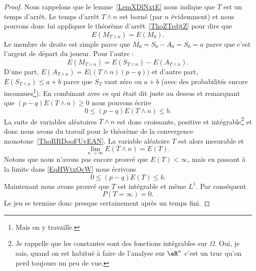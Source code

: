 \begin{proof}
	Nous rappelons que le lemme~\ref{LemXDlNxtE} nous indique que \( T\) est un temps d'arrêt. Le temps d'arrêt \( T\wedge n\) est borné (par \( n\) évidemment) et nous pouvons donc lui appliquer le théorème d'arrêt~\ref{ThoZTrdjtZ} pour dire que
	\begin{equation}
		E(M_{T\wedge n})=E(M_0).
	\end{equation}
	Le membre de droite est simple parce que \( M_0=S_0-A_0=S_0=a\) parce que c'est l'argent de départ du joueur. Pour l'autre :
	\begin{equation}    \label{EqKEkJvBg}
		E(M_{T\wedge n})=E(S_{T\wedge n})-E(A_{T\wedge n}).
	\end{equation}
	D'une part, \( E(A_{T\wedge n})=E\big( (T\wedge n)(p-q) \big)\) et d'autre part, \( E(S_{T\wedge n})\leq a+b\) parce que \( S_T\) vaut zéro ou \( a+b\) (avec des probabilités encore inconnues\footnote{Mais on y travaille.}). En combinant avec ce qui était dit juste au dessus et remarquant que \( (p-q)E(T\wedge n)\geq 0\) nous pouvons écrire
	\begin{equation}    \label{EqHWtxOcW}
		0\leq (p-q)E(T\wedge n)\leq b.
	\end{equation}
	La suite de variables aléatoires \( T\wedge n\) est donc croissante, positive et intégrable\footnote{Je rappelle que les constantes sont des fonctions intégrables sur \( \Omega\). Oui, je sais, quand on est habitué à faire de l'analyse sur \( \eR^n\) c'est un truc qu'on perd toujours un peu de vue.} et donc nous avons du travail pour le théorème de la convergence monotone~\ref{ThoRRDooFUvEAN}. La variable aléatoire \( T\) est alors mesurable et
	\begin{equation}    \label{EqABPXmgr}
		\lim_{n\to \infty} E(T\wedge n)=E(T).
	\end{equation}
	Notons que nous n'avons pas encore prouvé que \( E(T)<\infty\), mais en passant à la limite dans \eqref{EqHWtxOcW} nous écrivons
	\begin{equation}
		0\leq (p-q)E(T)\leq b.
	\end{equation}
	Maintenant nous avons prouvé que \( T\) est intégrable et même \( L^1\). Par conséquent
	\begin{equation}
		P(T=\infty)=0.
	\end{equation}
	Le jeu se termine donc presque certainement après un temps fini.
\end{proof}

